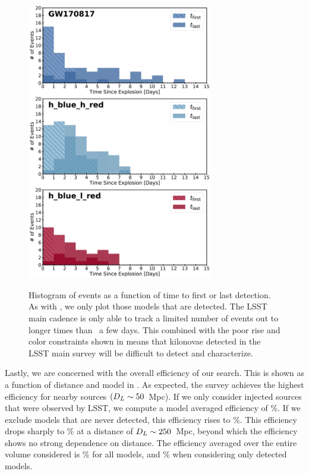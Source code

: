 \begin{figure}[!t]
\begin{center}
\hspace*{-0.1in}
\scalebox{1.}
{\includegraphics[width=0.725\textwidth]{./figs/chapter6/f2.pdf}}
\caption{\singlespace Histogram of events as a function of time to first or last detection. As with , we only plot those models that are detected. The LSST main cadence is only able to track a limited number of events out to longer times than \apx~a few days. This combined with the poor rise and color constraints shown in  means that kilonovae detected in the LSST main survey will be difficult to detect and characterize.}
\label{fig:ch6_t_hist}
\end{center}
\end{figure}

Lastly, we are concerned with the overall efficiency of our search. This is shown as a function of distance and model in . As expected, the survey achieves the highest efficiency for nearby sources $(D_L \sim50$~Mpc). If we only consider injected sources that were observed by LSST, we compute a model averaged efficiency of \%. If we exclude models that are never detected, this efficiency rises to \%. This efficiency drops sharply to \% at a distance of $D_L \sim250$~Mpc, beyond which the efficiency shows no strong dependence on distance. The efficiency averaged over the entire volume considered is \% for all models, and \% when considering only detected models.

